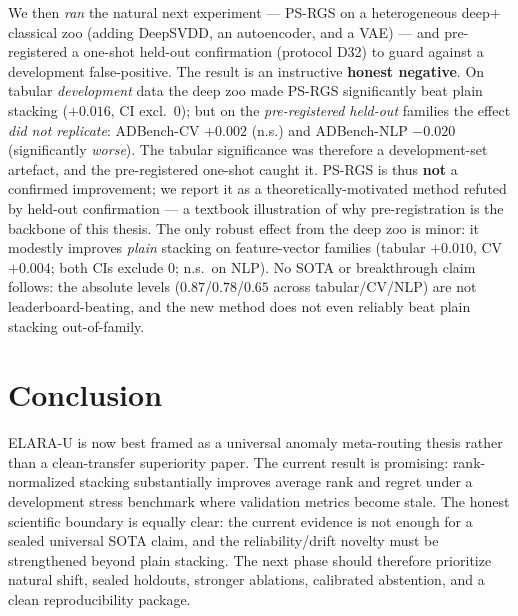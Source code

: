 \documentclass[11pt,titlepage]{article}
\newcommand{\systemu}{ELARA-U}
\begin{document}
We then \emph{ran} the natural next experiment --- PS-RGS on a heterogeneous
deep$+$classical zoo (adding DeepSVDD, an autoencoder, and a VAE) --- and pre-registered
a one-shot held-out confirmation (protocol D32) to guard against a development
false-positive. The result is an instructive \textbf{honest negative}. On tabular
\emph{development} data the deep zoo made PS-RGS significantly beat plain stacking
($+0.016$, CI excl.\ $0$); but on the \emph{pre-registered held-out} families the effect
\emph{did not replicate}: ADBench-CV $+0.002$ (n.s.) and ADBench-NLP $-0.020$
(significantly \emph{worse}). The tabular significance was therefore a development-set
artefact, and the pre-registered one-shot caught it. PS-RGS is thus \textbf{not} a
confirmed improvement; we report it as a theoretically-motivated method refuted by
held-out confirmation --- a textbook illustration of why pre-registration is the
backbone of this thesis. The only robust effect from the deep zoo is minor: it modestly
improves \emph{plain} stacking on feature-vector families (tabular $+0.010$, CV $+0.004$;
both CIs exclude $0$; n.s.\ on NLP). No SOTA or breakthrough claim follows: the absolute
levels ($0.87$/$0.78$/$0.65$ across tabular/CV/NLP) are not leaderboard-beating, and the
new method does not even reliably beat plain stacking out-of-family.

\section{Conclusion}

\systemu{} is now best framed as a universal anomaly meta-routing thesis rather
than a clean-transfer superiority paper. The current result is promising:
rank-normalized stacking substantially improves average rank and regret under a
development stress benchmark where validation metrics become stale. The honest
scientific boundary is equally clear: the current evidence is not enough for a
sealed universal SOTA claim, and the reliability/drift novelty must be
strengthened beyond plain stacking. The next phase should therefore prioritize
natural shift, sealed holdouts, stronger ablations, calibrated abstention, and a
clean reproducibility package.

\appendix

\end{document}
